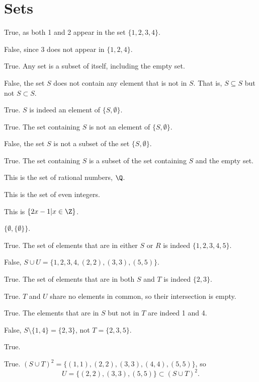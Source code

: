 \section{Sets}
\begin{questions}
    \item \begin{partquestions}{\alph*}
        \item True, as both 1 and 2 appear in the set $\{1, 2, 3, 4\}$.
        \item False, since 3 does not appear in $\{1, 2, 4\}$.
        \item True. Any set is a subset of itself, including the empty set.
        \item False, the set $S$ does not contain any element that is not in $S$. That is, $S \subseteq S$ but not $S \subset S$.
        \item True. $S$ is indeed an element of $\{S, \emptyset\}$.
        \item True. The set containing $S$ is not an element of $\{S, \emptyset\}$.
        \item False, the set $S$ is not a subset of the set $\{S, \emptyset\}$.
        \item True. The set containing $S$ is a subset of the set containing $S$ and the empty set.
    \end{partquestions}

    \item \begin{partquestions}{\alph*}
        \item This is the set of rational numbers, $\Q$.
        \item This is the set of even integers.
        \item This is $\{2x - 1 \vert x \in \Z\}$.
        \item $\{\emptyset, \{\emptyset\}\}$.
    \end{partquestions}

    \item \begin{partquestions}{\alph*}
        \item True. The set of elements that are in either $S$ or $R$ is indeed $\{1, 2, 3, 4, 5\}$.
        \item False, $S \cup U = \{1, 2, 3, 4, (2, 2), (3, 3), (5, 5)\}$.
        \item True. The set of elements that are in both $S$ and $T$ is indeed $\{2, 3\}$.
        \item True. $T$ and $U$ share no elements in common, so their intersection is empty.
        \item True. The elements that are in $S$ but not in $T$ are indeed 1 and 4.
        \item False, $S \setminus \{1, 4\} = \{2, 3\}$, not $T = \{2, 3, 5\}$.
        \item True.
        \item True. $(S \cup T)^2 = \{(1,1), (2,2), (3,3), (4,4), (5,5)\}$, so
        \[
            U = \{(2,2), (3,3), (5,5)\} \subset (S \cup T)^2.
        \]
    \end{partquestions}


\end{questions}
